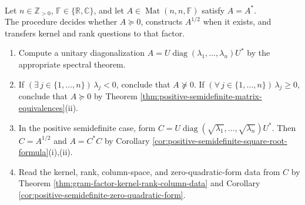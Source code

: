 \begin{computationmethod} \label{meth:psd-spectral-factorization} \\
Let $n\in\mathbb{Z}_{>0}$, $\mathbb{F}\in\{\mathbb{R},\mathbb{C}\}$, and let $A\in\operatorname{Mat}(n,n,\mathbb{F})$ satisfy $A=A^*$.\\
The procedure decides whether $A\succeq0$, constructs $A^{1/2}$ when it exists, and transfers kernel and rank questions to that factor.
\begin{enumerate}[label=(\roman*)]
\setlength{\itemsep}{0pt}
\item Compute a unitary diagonalization $A=U\operatorname{diag}(\lambda_1,\ldots,\lambda_n)U^*$ by the appropriate spectral theorem.
\item If $(\exists\,j\in\{1,\ldots,n\})\,\lambda_j<0$, conclude that $A\not\succeq0$. If $(\forall\,j\in\{1,\ldots,n\})\,\lambda_j\geq0$, conclude that $A\succeq0$ by Theorem \ref{thm:positive-semidefinite-matrix-equivalences}(ii).
\item In the positive semidefinite case, form $C=U\operatorname{diag}(\sqrt{\lambda_1},\ldots,\sqrt{\lambda_n})U^*$. Then $C=A^{1/2}$ and $A=C^*C$ by Corollary \ref{cor:positive-semidefinite-square-root-formula}(i),(ii).
\item Read the kernel, rank, column-space, and zero-quadratic-form data from $C$ by Theorem \ref{thm:gram-factor-kernel-rank-column-data} and Corollary \ref{cor:positive-semidefinite-zero-quadratic-form}.
\end{enumerate}
\end{computationmethod}

